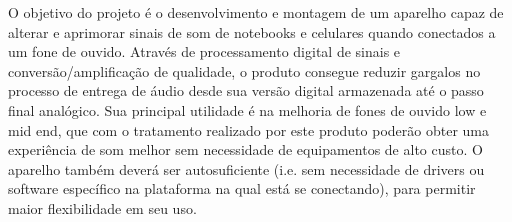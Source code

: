 
\begin{resumoutfpr}%
O objetivo do projeto é o desenvolvimento e montagem de um aparelho capaz de alterar e aprimorar sinais de som de notebooks e celulares quando conectados a um fone de ouvido. Através de processamento digital de sinais e conversão/amplificação de qualidade, o produto consegue reduzir gargalos no processo de entrega de áudio desde sua versão digital armazenada até o passo final analógico. Sua principal utilidade é na melhoria de fones de ouvido low e mid end, que com o tratamento realizado por este produto poderão obter uma experiência de som melhor sem necessidade de equipamentos de alto custo. O aparelho também deverá ser autosuficiente (i.e. sem necessidade de drivers ou software específico na plataforma na qual está se conectando), para permitir maior flexibilidade em seu uso.
\end{resumoutfpr}
